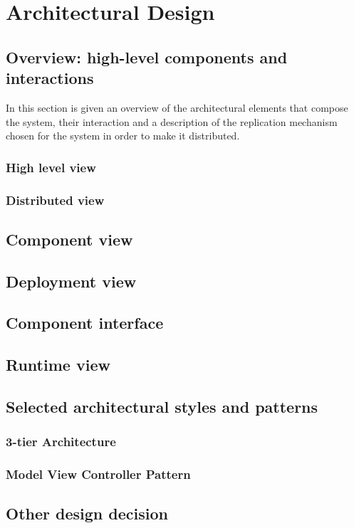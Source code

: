 \section{Architectural Design}
\subsection{Overview: high-level components
and interactions}
In this section is given an overview of the architectural elements that compose the system,
their interaction and a description of the replication mechanism chosen for the system in
order to make it distributed.
\subsubsection{High level view}
\subsubsection{Distributed view}
\subsection{Component view}
\subsection{Deployment view}
\subsection{Component interface}
\subsection{Runtime view}
\subsection{Selected architectural styles
and patterns}
\subsubsection{3-tier Architecture}
\subsubsection{Model View Controller Pattern}
\subsection{Other design decision}